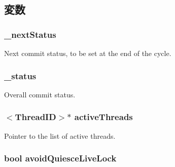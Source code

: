 \subsection{変数}
\hypertarget{classDefaultCommit_a96c6cf126a60fa550bd3e279b0f33838}{
\subsubsection[{\_\-nextStatus}]{ {\bf \_\-nextStatus}}}
\label{classDefaultCommit_a96c6cf126a60fa550bd3e279b0f33838}
Next commit status, to be set at the end of the cycle. \hypertarget{classDefaultCommit_a0cf11ec4d376480eb733b779911f6446}{
\subsubsection[{\_\-status}]{ {\bf \_\-status}}}
\label{classDefaultCommit_a0cf11ec4d376480eb733b779911f6446}
Overall commit status. \hypertarget{classDefaultCommit_af6eaea53db532812052f71bf0380dab5}{
\subsubsection[{activeThreads}]{$<${\bf ThreadID}$>$$\ast$ {\bf activeThreads}}}
\label{classDefaultCommit_af6eaea53db532812052f71bf0380dab5}
Pointer to the list of active threads. \hypertarget{classDefaultCommit_a7c6eee41dc1f18f1f485518f8b066033}{
\subsubsection[{avoidQuiesceLiveLock}]{\setlength{\rightskip}{0pt plus 5cm}bool {\bf avoidQuiesceLiveLock}}}
